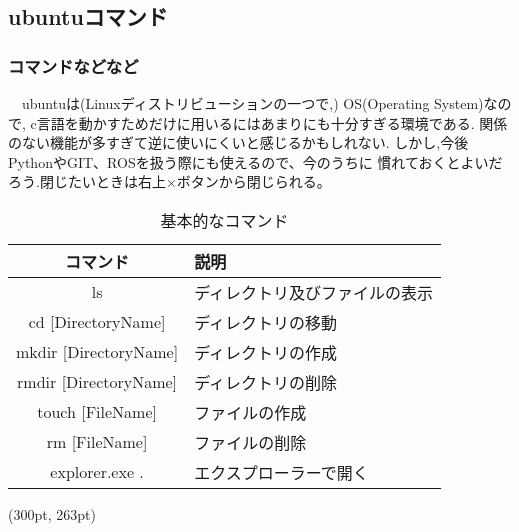 \documentclass[dvipdfmx]{beamer}
\begin{document}
\subsection{ubuntuコマンド}
\begin{frame}[t, fragile]
    \frametitle{コマンドなどなど}
    　ubuntuは(Linuxディストリビューションの一つで,)
    OS(Operating System)なので,
    c言語を動かすためだけに用いるにはあまりにも十分すぎる環境である.
    関係のない機能が多すぎて逆に使いにくいと感じるかもしれない.
    しかし,今後PythonやGIT、ROSを扱う際にも使えるので、今のうちに
    慣れておくとよいだろう.閉じたいときは右上×ボタンから閉じられる。
    \begin{table}[h]
        \caption{基本的なコマンド}
        \label{commands}
        \centering
        \vspace{-5pt}
        \begin{tabular}{cl}
            \hline
            コマンド & 説明\\               
            \hline \hline
            ls & ディレクトリ及びファイルの表示\\
            cd [DirectoryName] & ディレクトリの移動\\
            mkdir [DirectoryName] & ディレクトリの作成\\
            rmdir [DirectoryName] & ディレクトリの削除\\
            touch [FileName] & ファイルの作成\\
            rm [FileName] & ファイルの削除\\
            explorer.exe . & エクスプローラーで開く\\
            \hline
        \end{tabular}
    \end{table}
    \begin{textblock*}{0.3\linewidth}(300pt, 263pt)
    \space
    \end{textblock*}
\end{frame}
\end{document}
